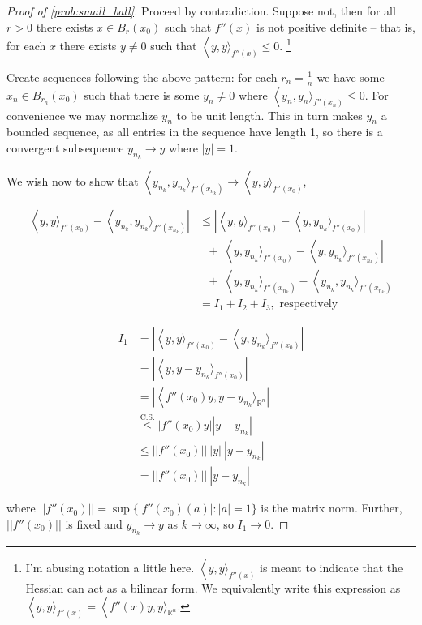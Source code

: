 \documentclass[english]{article}
\DeclareMathOperator{\R}{\mathbb{R}}
\DeclareMathOperator{\<}{\langle}
\renewcommand{\>}{\rangle}
\theoremstyle{definition}
\begin{document}
\begin{proof}[Proof of \cref{prob:small_ball}]
    Proceed by contradiction. Suppose not, then for all $r > 0$ there exists $x \in B_r(x_0)$ such that $f''(x)$ is not positive definite -- that is, for each $x$ there exists $y \neq 0$ such that $\< y, y \>_{f''(x)} \leq 0$. \footnote{I'm abusing notation a little here. $\< y, y \>_{f''(x)}$ is meant to indicate that the Hessian can act as a bilinear form. We equivalently write this expression as $\< y, y \>_{f''(x)} = \<f''(x)y, y \>_{\R^n}$.}

    Create sequences following the above pattern: for each $r_n = \frac{1}{n}$ we have some $x_n \in B_{r_n}(x_0)$ such that there is some $y_n \neq 0$ where $\< y_n, y_n \>_{f''(x_n)} \leq 0$. For convenience we may normalize $y_n$ to be unit length. This in turn makes $y_n$ a bounded sequence, as all entries in the sequence have length 1, so there is a convergent subsequence $y_{n_k} \to y$ where $|y| = 1$. 

    We wish now to show that $\<y_{n_k},y_{n_k}\>_{f''(x_{n_k})} \to \< y, y\>_{f''(x_0)}$,

    \begin{align*}
        |\< y, y\>_{f''(x_0)} - \<y_{n_k},y_{n_k}\>_{f''(x_{n_k})}|
        & \leq |\< y, y\>_{f''(x_0)} - \<y,y_{n_k}\>_{f''(x_0)}| \\
        & \ \ \ + |\< y, y_{n_k}\>_{f''(x_0)} - \<y,y_{n_k}\>_{f''(x_{n_k})}| \\
        & \ \ \ + |\< y, y_{n_k}\>_{f''(x_{n_k})} - \<y_{n_k},y_{n_k}\>_{f''(x_{n_k})}| \\
        & = I_1 + I_2 + I_3, \text{ respectively}
    \end{align*}

    \begin{align*}
        I_1
        & = |\< y, y\>_{f''(x_0)} - \<y,y_{n_k}\>_{f''(x_0)}| \\
        & = |\< y, y - y_{n_k}\>_{f''(x_0)}| \\
        & = |\<f''(x_0)y, y - y_{n_k}\>_{\R^n}| \\
        & \overset{\text{C.S.}}{\leq} |f''(x_0)y||y - y_{n_k}| \\
        & \leq ||f''(x_0)|| \ |y| \ |y - y_{n_k}| \\
        & = ||f''(x_0)||\ |y - y_{n_k}|
    \end{align*}

    where $||f''(x_0)|| = \sup \{\left|f''(x_0)(a)\right| : |a| = 1\}$ is the matrix norm. Further, $||f''(x_0)||$ is fixed and $y_{n_k} \to y$ as $k \to \infty$, so $I_1 \to 0$.
    

\end{proof}
\end{document}
